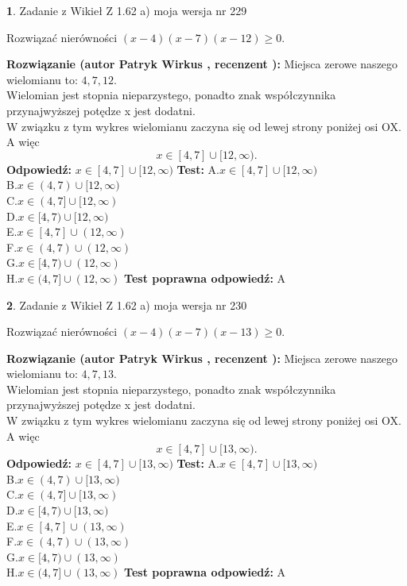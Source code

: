 \documentclass[12pt, a4paper]{article}
\theoremstyle{definition} %
\newtheorem{zad}{}
\newcommand{\zadStart}[1]{\begin{zad}#1\newline}
\newcommand{\zadStop}{\end{zad}}
\newcommand{\rozwStart}[2]{\noindent \textbf{Rozwiązanie (autor #1 , recenzent #2): }\newline}
\newcommand{\rozwStop}{\newline}
\newcommand{\odpStart}{\noindent \textbf{Odpowiedź:}\newline}
\newcommand{\odpStop}{\newline}
\newcommand{\testStart}{\noindent \textbf{Test:}\newline}
\newcommand{\testStop}{\newline}
\newcommand{\kluczStart}{\noindent \textbf{Test poprawna odpowiedź:}\newline}
\newcommand{\kluczStop}{\newline}
\begin{document}
\zadStart{Zadanie z Wikieł Z 1.62 a) moja wersja nr 229}

Rozwiązać nierówności $(x-4)(x-7)(x-12)\ge0$.
\zadStop
\rozwStart{Patryk Wirkus}{}
Miejsca zerowe naszego wielomianu to: $4, 7, 12$.\\
Wielomian jest stopnia nieparzystego, ponadto znak współczynnika przy\linebreak najwyższej potędze x jest dodatni.\\ W związku z tym wykres wielomianu zaczyna się od lewej strony poniżej osi OX. A więc $$x \in [4,7] \cup [12,\infty).$$
\rozwStop
\odpStart
$x \in [4,7] \cup [12,\infty)$
\odpStop
\testStart
A.$x \in [4,7] \cup [12,\infty)$\\
B.$x \in (4,7) \cup [12,\infty)$\\
C.$x \in (4,7] \cup [12,\infty)$\\
D.$x \in [4,7) \cup [12,\infty)$\\
E.$x \in [4,7] \cup (12,\infty)$\\
F.$x \in (4,7) \cup (12,\infty)$\\
G.$x \in [4,7) \cup (12,\infty)$\\
H.$x \in (4,7] \cup (12,\infty)$
\testStop
\kluczStart
A
\kluczStop



\zadStart{Zadanie z Wikieł Z 1.62 a) moja wersja nr 230}

Rozwiązać nierówności $(x-4)(x-7)(x-13)\ge0$.
\zadStop
\rozwStart{Patryk Wirkus}{}
Miejsca zerowe naszego wielomianu to: $4, 7, 13$.\\
Wielomian jest stopnia nieparzystego, ponadto znak współczynnika przy\linebreak najwyższej potędze x jest dodatni.\\ W związku z tym wykres wielomianu zaczyna się od lewej strony poniżej osi OX. A więc $$x \in [4,7] \cup [13,\infty).$$
\rozwStop
\odpStart
$x \in [4,7] \cup [13,\infty)$
\odpStop
\testStart
A.$x \in [4,7] \cup [13,\infty)$\\
B.$x \in (4,7) \cup [13,\infty)$\\
C.$x \in (4,7] \cup [13,\infty)$\\
D.$x \in [4,7) \cup [13,\infty)$\\
E.$x \in [4,7] \cup (13,\infty)$\\
F.$x \in (4,7) \cup (13,\infty)$\\
G.$x \in [4,7) \cup (13,\infty)$\\
H.$x \in (4,7] \cup (13,\infty)$
\testStop
\kluczStart
A
\kluczStop
\end{document}
